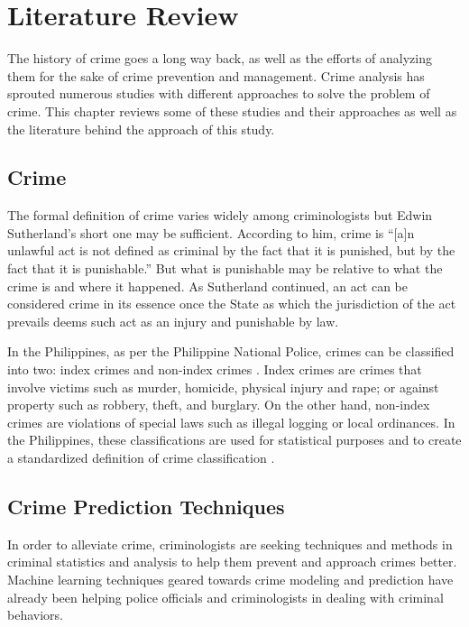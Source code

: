 \section{Literature Review}
    The history of crime goes a long way back, as well as the efforts of analyzing them for the sake of crime prevention and management. Crime analysis has sprouted numerous studies with different approaches to solve the problem of crime. This chapter reviews some of these studies and their approaches as well as the literature behind the approach of this study.
\subsection{Crime}
    The formal definition of crime varies widely among criminologists but Edwin Sutherland’s short one may be sufficient. According to him, crime is “[a]n unlawful act is not defined as criminal by the fact that it is punished, but by the fact that it is punishable.” \cite{brown2010criminology} But what is punishable may be relative to what the crime is and where it happened. As Sutherland continued, an act can be considered crime in its essence once the State as which the jurisdiction of the act prevails deems such act as an injury and punishable by law.

    In the Philippines, as per the Philippine National Police, crimes can be classified into two: index crimes and non-index crimes \cite{senate2013criminal}. Index crimes are crimes that involve victims such as murder, homicide, physical injury and rape; or against property such as robbery, theft, and burglary. On the other hand, non-index crimes are violations of special laws such as illegal logging or local ordinances. In the Philippines, these classifications are used for statistical purposes and to create a standardized definition of crime classification \cite{tumulak2015crime}.

\subsection{Crime Prediction Techniques}
    In order to alleviate crime, criminologists are seeking techniques and methods in criminal statistics and analysis to help them prevent and approach crimes better. Machine learning techniques geared towards crime modeling and prediction have already been helping police officials and criminologists in dealing with criminal behaviors.

